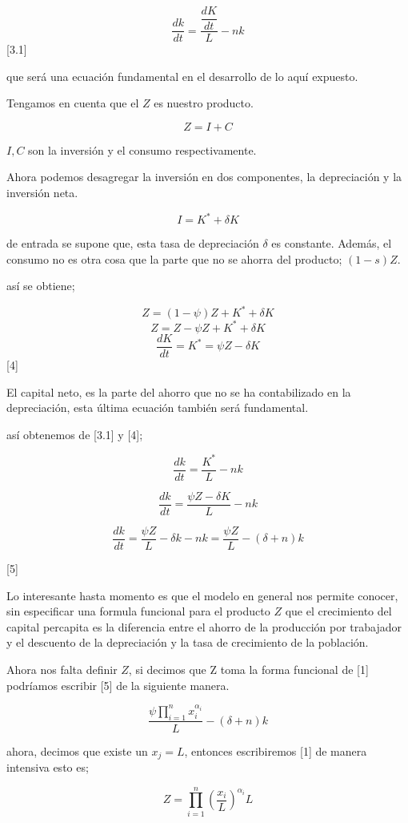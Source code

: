 \documentclass[12pt]{article}
\begin{document}
$$\dfrac{dk}{dt}=\dfrac{\dfrac{dK}{dt}}{L}-nk$$ [3.1] 

que será una ecuación fundamental en el desarrollo de lo aquí expuesto.






Tengamos en cuenta que el $Z$ es nuestro producto.

$$Z=I+C$$

$I,C$ son la inversión y el consumo respectivamente.

Ahora podemos desagregar la inversión en dos componentes, la depreciación y la inversión neta.

$$I=K^{*}+\delta K$$

de entrada se supone que, esta tasa de depreciación $\delta$ es constante. Además, el consumo no es otra cosa que la parte que no  se ahorra del producto; $(1-s)Z$.

así se obtiene;

$$Z= (1-\psi)Z+K^{*}+\delta K$$
$$Z=Z-\psi Z +K^{*}+\delta K$$
$$\dfrac{dK}{dt}=K^{*}= \psi Z - \delta K $$ [4]

El capital neto, es la parte del ahorro  que no se ha contabilizado en la depreciación, esta última ecuación también será fundamental.

así obtenemos de [3.1] y [4];


$$\dfrac{dk}{dt}=\dfrac{K^{*}}{L}-nk$$

$$\dfrac{dk}{dt}=\dfrac{\psi Z - \delta K}{L}-nk$$

$$\dfrac{dk}{dt}=\dfrac{\psi Z}{L}- \delta k -nk = \dfrac{\psi Z}{L}-(\delta  + n)k $$

[5]

Lo interesante hasta  momento es que el modelo en general nos permite conocer, sin especificar una formula funcional para el producto $Z$ que el crecimiento del capital percapita es la diferencia entre el ahorro de la producción por trabajador y el descuento de la depreciación y la tasa de crecimiento de la población. 




Ahora nos falta definir $Z$, si decimos que Z toma la forma funcional de [1] podríamos escribir [5] de la siguiente manera.

$$ \dfrac{ \psi \prod_{i=1}^nx_i^{\alpha_i} }{L}- (\delta + n)k$$

ahora, decimos que existe un $x_{j}=L$, entonces escribiremos [1] de manera intensiva esto es;


$$Z=\prod_{i=1}^{n}\left(\dfrac{x_i}{L}\right)^{\alpha_i}L$$
\end{document}
